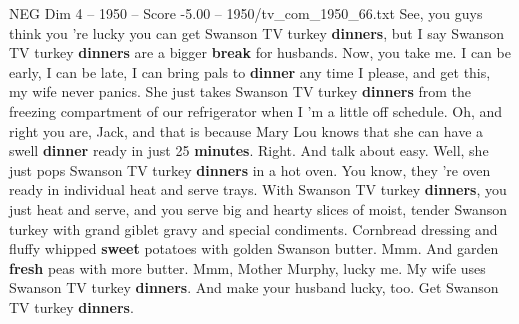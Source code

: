 \begin{textsample}{NEG Dim 4 – 1950 – Score -5.00 – 1950/tv\_com\_1950\_66.txt}  \label{ex:f4_neg_005}
See, you guys think you 're lucky you can get Swanson TV turkey \textbf{dinners}, but I say Swanson TV turkey \textbf{dinners} are a bigger \textbf{break} for husbands.
Now, you take me.
I can be early, I can be late, I can bring pals to \textbf{dinner} any time I please, and get this, my wife never panics.
She just takes Swanson TV turkey \textbf{dinners} from the freezing compartment of our refrigerator when I 'm a little off schedule.
Oh, and right you are, Jack, and that is because Mary Lou knows that she can have a swell \textbf{dinner} ready in just 25 \textbf{minutes}.
Right.
And talk about easy.
Well, she just pops Swanson TV turkey \textbf{dinners} in a hot oven.
You know, they 're oven ready in individual heat and serve trays.
With Swanson TV turkey \textbf{dinners}, you just heat and serve, and you serve big and hearty slices of moist, tender Swanson turkey with grand giblet gravy and special condiments.
Cornbread dressing and fluffy whipped \textbf{sweet} potatoes with golden Swanson butter.
Mmm.
And garden \textbf{fresh} peas with more butter.
Mmm, Mother Murphy, lucky me.
My wife uses Swanson TV turkey \textbf{dinners}.
And make your husband lucky, too.
Get Swanson TV turkey \textbf{dinners}.

\end{textsample}
